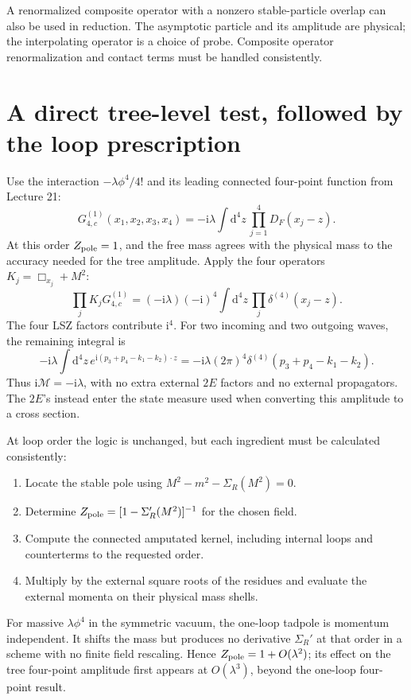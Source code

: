 \documentclass[11pt]{article}
\newcommand{\dd}{\mathrm d}
\newcommand{\ii}{\mathrm i}
\newcommand{\module}[1]{\clearpage\section{#1}}
\newcommand{\cM}{\mathcal M}
\newcommand{\Zp}{Z_{\rm pole}}
\begin{document}
\begin{keyidea}
A renormalized composite operator with a nonzero stable-particle overlap
can also be used in reduction. The asymptotic particle and its amplitude
are physical; the interpolating operator is a choice of probe. Composite
operator renormalization and contact terms must be handled consistently.
\end{keyidea}

\module{A direct tree-level test, followed by the loop prescription}
Use the interaction \(-\lambda\phi^4/4!\) and its leading connected
four-point function from Lecture 21:
\begin{equation}
 G_{4,c}^{(1)}(x_1,x_2,x_3,x_4)
 =-\ii\lambda\int\dd^4z\,\prod_{j=1}^4D_F(x_j-z).
 \label{eq:treeG}
\end{equation}
At this order \(\Zp=1\), and the free mass agrees with the physical mass
to the accuracy needed for the tree amplitude. Apply the four operators
\(K_j=\Box_{x_j}+M^2\):
\begin{equation}
 \prod_jK_jG_{4,c}^{(1)}
 =(-\ii\lambda)(-\ii)^4\int\dd^4z\,
 \prod_j\delta^{(4)}(x_j-z).
\end{equation}
The four LSZ factors contribute \(\ii^4\). For two incoming and two
outgoing waves, the remaining integral is
\begin{equation}
 -\ii\lambda\int\dd^4z\,e^{\ii(p_3+p_4-k_1-k_2)\cdot z}
 =-\ii\lambda(2\pi)^4\delta^{(4)}(p_3+p_4-k_1-k_2).
\end{equation}
Thus \(\ii\cM=-\ii\lambda\), with no extra external \(2E\) factors and no
external propagators. The \(2E\)'s instead enter the state measure used
when converting this amplitude to a cross section.

At loop order the logic is unchanged, but each ingredient must be
calculated consistently:
\begin{enumerate}
 \item Locate the stable pole using \(M^2-m^2-\Sigma_R(M^2)=0\).
 \item Determine \(\Zp=[1-\Sigma_R'(M^2)]^{-1}\) for the chosen field.
 \item Compute the connected amputated kernel, including internal loops
 and counterterms to the requested order.
 \item Multiply by the external square roots of the residues and evaluate
 the external momenta on their physical mass shells.
\end{enumerate}
For massive \(\lambda\phi^4\) in the symmetric vacuum, the one-loop tadpole
is momentum independent. It shifts the mass but produces no derivative
\(\Sigma_R'\) at that order in a scheme with no finite field rescaling.
Hence \(\Zp=1+O(\lambda^2)\); its effect on the tree four-point amplitude
first appears at \(O(\lambda^3)\), beyond the one-loop four-point result.
\end{document}
